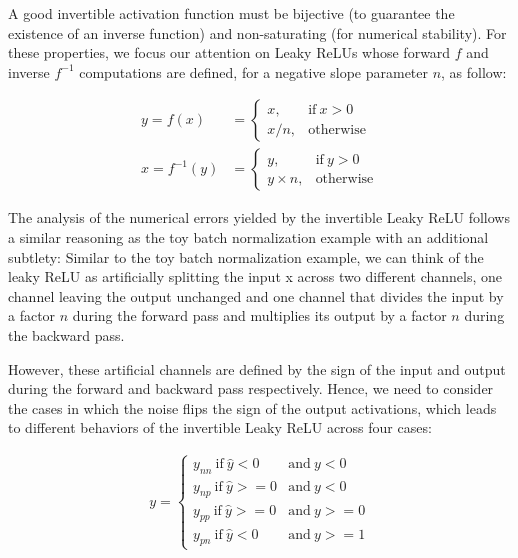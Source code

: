 \documentclass[twocolumn]{bmcart}
\begin{document}
A good invertible activation function must be bijective (to guarantee the existence of an inverse function) and non-saturating (for numerical stability).
For these properties, we focus our attention on Leaky ReLUs whose forward $f$ and inverse $f^{-1}$ computations are defined, for a negative slope parameter $n$, as follow:

\begin{subequations}
\begin{align}
y = f(x) &=      \begin{cases}
x, & \text{if}\ x>0 \\
x / n, & \text{otherwise}
\end{cases} \\
x = f^{-1}(y) &= \begin{cases}
y, & \text{if}\ y>0 \\
y \times n, & \text{otherwise}
\end{cases}
\end{align}
\end{subequations}

The analysis of the numerical errors yielded by the invertible Leaky ReLU follows a similar reasoning as the toy batch normalization example with an additional subtlety:
Similar to the toy batch normalization example, we can think of the leaky ReLU as artificially splitting the input x across two different channels,
one channel leaving the output unchanged and one channel that divides the input by a factor $n$ during the forward pass and multiplies its output by a factor $n$ during the backward pass.

However, these artificial channels are defined by the sign of the input and output during the forward and backward pass respectively.
Hence, we need to consider the cases in which the noise flips the sign of the output activations,
which leads to different behaviors of the invertible Leaky ReLU across four cases:

\begin{subequations}
\begin{align}
y = \begin{cases}
y_{nn} \  \text{if}\  \hat{y}<0    &\text{and}\  y<0  \\
y_{np} \  \text{if}\  \hat{y}>=0   &\text{and}\  y<0  \\
y_{pp} \  \text{if}\  \hat{y}>=0   &\text{and}\  y>=0 \\
y_{pn} \  \text{if}\  \hat{y}<0    &\text{and}\  y>=1
\end{cases}
\end{align}
\end{subequations}
\end{document}
